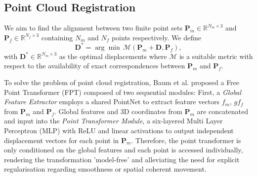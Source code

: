 \subsection{Point Cloud Registration}
We aim to find the alignment between two finite point sets $\mathbf{P}_m \in \mathbb{R}^{N_m \times 3}$ and $\mathbf{P}_f \in \mathbb{R}^{N_f \times 3}$ containing $N_m$ and $N_f$ points respectively. We define 
\begin{equation}
    \mathbf{D}^* = \arg\min  \,\mathcal{M}(\mathbf{P}_m + \mathbf{D}, \mathbf{P}_f), 
\end{equation}
with $\mathbf{D}^* \in \mathbb{R}^{N_m \times 3}$ as the optimal displacements where $\mathcal{M}$ is a suitable metric with respect to the availability of exact correspondences between $\mathbf{P}_m$ and $\mathbf{P}_f$. 

To solve the problem of point cloud registration, Baum et al. proposed a Free Point Transformer (FPT) \citep{baum2021real} composed of two sequential modules: First, a \textit{Global Feature Extractor} employs a shared PointNet \citep{qi2017pointnet} to extract feature vectors $f_m$, $gf_f$ from $\mathbf{P}_m$ and $\mathbf{P}_f$. Global features and 3D coordinates from $\mathbf{P}_m$ are concatenated and input into the \textit{Point Transformer Module}, a six-layered Multi Layer Perceptron (MLP) with ReLU and linear activations to output independent displacement vectors for each point in $\mathbf{P}_m$. Therefore, the point transformer is only conditioned on the global features and each point is accessed individually, rendering the transformation  'model-free' and alleviating the need for explicit regularisation regarding smoothness or spatial coherent movement.


